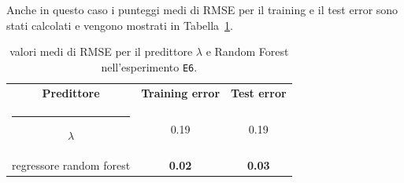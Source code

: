 \documentclass[12pt]{report}
\makeatletter
\theoremstyle{definition}
\newcommand{\thickhline}{%
    \noalign {\ifnum 0=`}\fi \hrule height 1pt
    \futurelet \reserved@a \@xhline
}
\makeatother
\begin{document}
Anche in questo caso i punteggi medi di RMSE per il training e il test error sono stati calcolati e vengono mostrati in Tabella~\ref{rmse_exp6}. 
\begin{table}
\centering
\begin{adjustbox}{max width=\textwidth}
 \begin{tabular}{|c|c|c|} 
 \hline
\textbf{Predittore} & \textbf{Training error} & \textbf{Test error}
\\ [0.5ex] 
 \thickhline
 $\lambda$ & 0.19 & 0.19 \\
 regressore random forest & \textbf{0.02} & \textbf{0.03}
 \\
 \hline
\end{tabular}
\end{adjustbox}
\caption{valori medi di RMSE per il predittore $\lambda$ e Random Forest nell'esperimento \texttt{E6}.}
\label{rmse_exp6}
\end{table}
\end{document}
